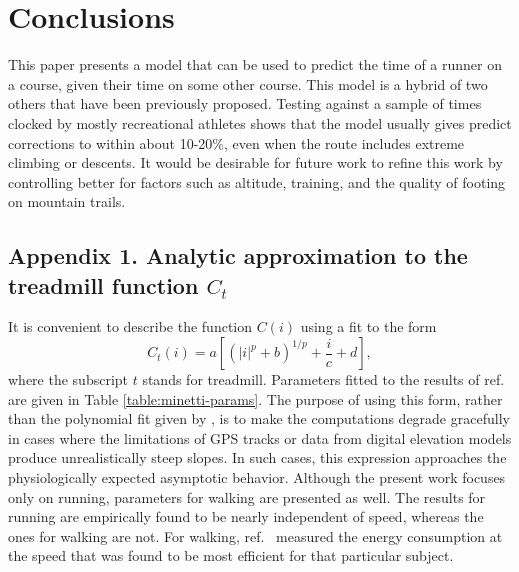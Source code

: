 \documentclass[10pt,letterpaper]{article}
\begin{document}
\section{Conclusions}
This paper presents a model that can be used to predict the time of a runner on a
course, given their time on some other course. This model is a hybrid of two others that have been previously
proposed. Testing against a sample of times
clocked by mostly recreational athletes shows that
the model usually gives predict corrections
to within about 10-20\%, even when the route includes extreme climbing or descents.
It would be desirable for future work to refine this work by controlling better for factors such
as altitude, training, and the quality of footing on mountain trails.

\subsection*{Appendix 1. Analytic approximation to the treadmill function $C_t$}

It is convenient to describe the function $C(i)$ using a fit to the form
\begin{equation}\label{eq:minetti-fit}
  C_t(i) = a\left[(|i|^p+b)^{1/p}+\frac{i}{c}+d\right],
\end{equation}
where the subscript $t$ stands for treadmill.
Parameters fitted to the results of ref.~\cite{minetti} are given in Table \ref{table:minetti-params}.
The purpose of using this form, rather than the polynomial fit given by \cite{minetti}, is
to make the computations degrade gracefully in cases where the limitations of GPS tracks or data from digital elevation models
produce unrealistically steep slopes. In such cases, this expression approaches the physiologically
expected asymptotic behavior. Although the present work focuses only on running, parameters for walking
are presented as well. The results for running are empirically found to be nearly independent of speed,
whereas the ones for walking are not. For walking, ref.~\cite{minetti} measured the energy consumption
at the speed that was found to be most efficient for that
particular subject.
\end{document}
